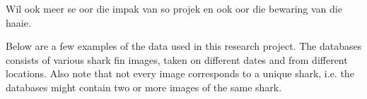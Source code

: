 \documentclass[a4paper,10pt]{article}
\begin{document}
Wil ook meer se oor die impak van so projek en ook oor die bewaring van die
haaie.

\newpage
Below are a few examples of the data used in this research project.  
The databases consists of various shark fin images, taken on different dates and
from different locations.
Also note that not every image corresponds to a unique shark, i.e. the databases
might contain two or more images of the same shark.

\begin{figure}[H]
\centering
\mbox{ \quad
{} \quad
{}}
\end{figure}
\end{document}
